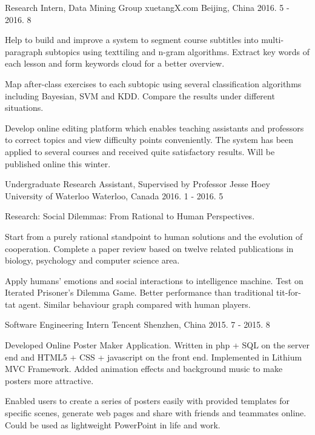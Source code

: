 \begin{cventries}
  \cventry
    {Research Intern, Data Mining Group}
    {xuetangX.com}
    {Beijing, China}
    {2016. 5 - 2016. 8}
    {
      \begin{cvitems}
      \item{Help to build and improve a system to segment course subtitles into multi-paragraph subtopics using texttiling and n-gram algorithms. Extract key words of each lesson and form keywords cloud for a better overview.}
        \item{Map after-class exercises to each subtopic using several classification algorithms including Bayesian, SVM and KDD. Compare the results under different situations.}
        \item{Develop online editing platform which enables teaching assistants and professors to correct topics and view difficulty points conveniently. The system has been applied to several courses and received quite satisfactory results. Will be published online this winter.}
      \end{cvitems}
    }
  \cventry
    {Undergraduate Research Assistant, Supervised by Professor Jesse Hoey}
    {University of Waterloo}
    {Waterloo, Canada}
    {2016. 1 - 2016. 5}
    {
      \begin{cvitems}
        \item {Research: Social Dilemmas: From Rational to Human Perspectives.}
        \item {Start from a purely rational standpoint to human solutions and the evolution of cooperation. Complete a paper review based on twelve related publications in biology, psychology and computer science area.}
        \item {Apply humans' emotions and social interactions to intelligence machine. Test on Iterated Prisoner's Dilemma Game. Better performance than traditional tit-for-tat agent. Similar behaviour graph compared with human players.}
      \end{cvitems}
    }
  \cventry
    {Software Engineering Intern}
    {Tencent}
    {Shenzhen, China}
    {2015. 7 - 2015. 8}
    {
      \begin{cvitems}
        \item {Developed Online Poster Maker Application. Written in php + SQL on the server end and HTML5 + CSS + javascript on the front end. Implemented in Lithium MVC Framework. Added animation effects and background music to make posters more attractive.}
        \item {Enabled users to create a series of posters easily with provided templates for specific scenes, generate web pages and share with friends and teammates online. Could be used as lightweight PowerPoint in life and work.}

\end{cvitems}}
\end{cventries}
